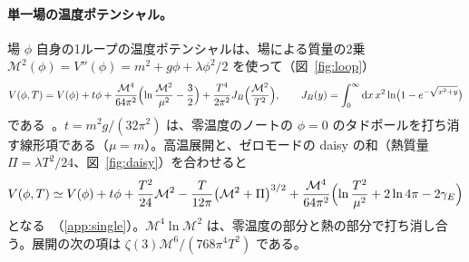 \documentclass[a4paper,10pt]{ltjsarticle}
\newcommand{\dd}{\mathrm{d}}
\begin{document}
\paragraph{単一場の温度ポテンシャル。}場 $\phi$ 自身の1ループの温度ポテンシャルは、場による質量の2乗 $\mathcal M^2(\phi)=V''(\phi)=m^2+g\phi+\lambda\phi^2/2$ を使って（図~\ref{fig:loop}）
\begin{equation}
V(\phi,T)=V(\phi)+t\phi+\frac{\mathcal M^4}{64\pi^2}\Bigl(\ln\frac{\mathcal M^2}{\mu^2}-\frac32\Bigr)+\frac{T^4}{2\pi^2}J_B\Bigl(\frac{\mathcal M^2}{T^2}\Bigr),\qquad
J_B(y)=\int_0^\infty\dd x\,x^2\ln\bigl(1-e^{-\sqrt{x^2+y}}\bigr)
\label{eq:V1loop}
\end{equation}
である~\cite{dolanjackiw}。$t=m^2g/(32\pi^2)$ は、零温度のノートの $\phi=0$ のタドポールを打ち消す線形項である（$\mu=m$）。高温展開と、ゼロモードの daisy の和（熱質量 $\Pi=\lambda T^2/24$、図~\ref{fig:daisy}）を合わせると
\begin{equation}
V(\phi,T)\simeq V(\phi)+t\phi+\frac{T^2}{24}\mathcal M^2-\frac{T}{12\pi}\bigl(\mathcal M^2+\Pi\bigr)^{3/2}+\frac{\mathcal M^4}{64\pi^2}\Bigl(\ln\frac{T^2}{\mu^2}+2\ln4\pi-2\gamma_E\Bigr)
\label{eq:Vht}
\end{equation}
となる~\cite{arnoldespinosa}（\ref{app:single}）。$\mathcal M^4\ln\mathcal M^2$ は、零温度の部分と熱の部分で打ち消し合う。展開の次の項は $\zeta(3)\mathcal M^6/(768\pi^4T^2)$ である。
\end{document}
